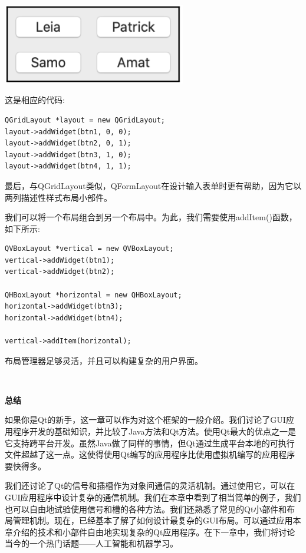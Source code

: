 \begin{center}
	\includegraphics[width=0.6\textwidth]{content/Section-2/Chapter-14/18}
\end{center}

这是相应的代码: \par

\begin{lstlisting}[caption={}]
QGridLayout *layout = new QGridLayout;
layout->addWidget(btn1, 0, 0);
layout->addWidget(btn2, 0, 1);
layout->addWidget(btn3, 1, 0);
layout->addWidget(btn4, 1, 1);
\end{lstlisting}

最后，与QGridLayout类似，QFormLayout在设计输入表单时更有帮助，因为它以两列描述性样式布局小部件。 \par
我们可以将一个布局组合到另一个布局中。为此，我们需要使用addItem()函数，如下所示: \par

\begin{lstlisting}[caption={}]
QVBoxLayout *vertical = new QVBoxLayout;
vertical->addWidget(btn1);
vertical->addWidget(btn2);

QHBoxLayout *horizontal = new QHBoxLayout;
horizontal->addWidget(btn3);
horizontal->addWidget(btn4);

vertical->addItem(horizontal);
\end{lstlisting}

布局管理器足够灵活，并且可以构建复杂的用户界面。 \par

\noindent\textbf{}\ \par
\textbf{总结} \ \par
如果你是Qt的新手，这一章可以作为对这个框架的一般介绍。我们讨论了GUI应用程序开发的基础知识，并比较了Java方法和Qt方法。使用Qt最大的优点之一是它支持跨平台开发。虽然Java做了同样的事情，但Qt通过生成平台本地的可执行文件超越了这一点。这使得使用Qt编写的应用程序比使用虚拟机编写的应用程序要快得多。 \par
我们还讨论了Qt的信号和插槽作为对象间通信的灵活机制。通过使用它，可以在GUI应用程序中设计复杂的通信机制。我们在本章中看到了相当简单的例子，我们也可以自由地试验使用信号和槽的各种方法。我们还熟悉了常见的Qt小部件和布局管理机制。现在，已经基本了解了如何设计最复杂的GUI布局。可以通过应用本章介绍的技术和小部件自由地实现复杂的Qt应用程序。在下一章中，我们将讨论当今的一个热门话题——人工智能和机器学习。 \par

